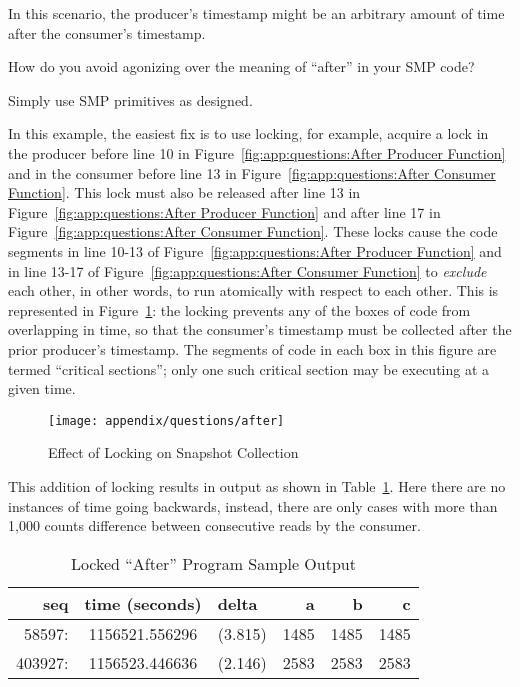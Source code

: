 In this scenario, the producer's timestamp might be an arbitrary
amount of time after the consumer's timestamp.

How do you avoid agonizing over the meaning of ``after'' in your
SMP code?

Simply use SMP primitives as designed.

In this example, the easiest fix is to use locking, for example,
acquire a lock in the producer before line 10 in
Figure~\ref{fig:app:questions:After Producer Function} and in
the consumer before line 13 in
Figure~\ref{fig:app:questions:After Consumer Function}.
This lock must also be released after line 13 in
Figure~\ref{fig:app:questions:After Producer Function} and
after line 17 in
Figure~\ref{fig:app:questions:After Consumer Function}.
These locks cause the code segments in line 10-13 of
Figure~\ref{fig:app:questions:After Producer Function} and in line 13-17 of
Figure~\ref{fig:app:questions:After Consumer Function} to {\em exclude}
each other, in other words, to run atomically with respect to each other.
This is represented in
Figure~\ref{fig:app:questions:Effect of Locking on Snapshot Collection}:
the locking prevents any of the boxes of code from overlapping in time, so
that the consumer's timestamp must be collected after the prior
producer's timestamp.
The segments of code in each box in this figure are termed
``critical sections''; only one such critical section may be executing
at a given time.

\begin{figure}[htb]
\centering
\texttt{[image: appendix/questions/after]}
\caption{Effect of Locking on Snapshot Collection}
\label{fig:app:questions:Effect of Locking on Snapshot Collection}
\end{figure}

This addition of locking results in output as shown in
Table~\ref{fig:app:questions:Locked After Program Sample Output}.
Here there are no instances of time going backwards, instead,
there are only cases with more than 1,000 counts difference between
consecutive reads by the consumer.

\begin{table}[htbp]
\centering
\scriptsize
\begin{tabular}{rcrrrr}
seq    & time (seconds) & delta~    &  a &  b &  c \\
\hline
58597:  & 1156521.556296 & (3.815) & 1485 & 1485 & 1485 \\
403927: & 1156523.446636 & (2.146) & 2583 & 2583 & 2583 \\
\end{tabular}
\caption{Locked ``After'' Program Sample Output}
\label{fig:app:questions:Locked After Program Sample Output}
\end{table}

